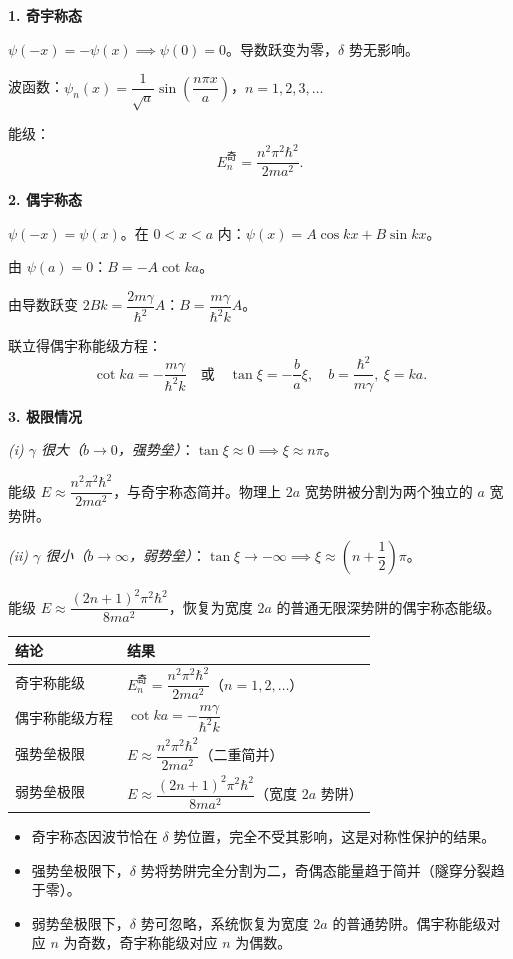 \begin{derivationbox}[标准解题过程]
\textbf{1. 奇宇称态}

$\psi(-x)=-\psi(x)\implies\psi(0)=0$。导数跃变为零，$\delta$ 势无影响。

波函数：$\psi_n(x)=\dfrac{1}{\sqrt{a}}\sin\left(\dfrac{n\pi x}{a}\right)$，$n=1,2,3,\ldots$

能级：
\begin{equation}
\boxed{E_n^{\text{奇}}=\frac{n^2\pi^2\hbar^2}{2ma^2}.}
\end{equation}

\textbf{2. 偶宇称态}

$\psi(-x)=\psi(x)$。在 $0<x<a$ 内：$\psi(x)=A\cos kx+B\sin kx$。

由 $\psi(a)=0$：$B=-A\cot ka$。

由导数跃变 $2Bk=\dfrac{2m\gamma}{\hbar^2}A$：$B=\dfrac{m\gamma}{\hbar^2k}A$。

联立得偶宇称能级方程：
\begin{equation}
\boxed{\cot ka=-\frac{m\gamma}{\hbar^2k}\quad\text{或}\quad\tan\xi=-\frac{b}{a}\xi,\quad b=\frac{\hbar^2}{m\gamma},\ \xi=ka.}
\end{equation}

\textbf{3. 极限情况}

\textit{(i) $\gamma$ 很大（$b\to0$，强势垒）}：$\tan\xi\approx0\implies\xi\approx n\pi$。

能级 $E\approx\dfrac{n^2\pi^2\hbar^2}{2ma^2}$，与奇宇称态简并。物理上 $2a$ 宽势阱被分割为两个独立的 $a$ 宽势阱。

\textit{(ii) $\gamma$ 很小（$b\to\infty$，弱势垒）}：$\tan\xi\to-\infty\implies\xi\approx\left(n+\dfrac{1}{2}\right)\pi$。

能级 $E\approx\dfrac{(2n+1)^2\pi^2\hbar^2}{8ma^2}$，恢复为宽度 $2a$ 的普通无限深势阱的偶宇称态能级。
\end{derivationbox}

\begin{formulabox}[答案汇总]
\begin{center}
\begin{tabular}{ll}
\toprule
\textbf{结论} & \textbf{结果} \\
\midrule
奇宇称能级 & $E_n^{\text{奇}}=\dfrac{n^2\pi^2\hbar^2}{2ma^2}$（$n=1,2,\ldots$） \\
偶宇称能级方程 & $\cot ka=-\dfrac{m\gamma}{\hbar^2k}$ \\
强势垒极限 & $E\approx\dfrac{n^2\pi^2\hbar^2}{2ma^2}$（二重简并） \\
弱势垒极限 & $E\approx\dfrac{(2n+1)^2\pi^2\hbar^2}{8ma^2}$（宽度 $2a$ 势阱） \\
\bottomrule
\end{tabular}
\end{center}
\end{formulabox}

\begin{insightbox}[物理图像]
\begin{itemize}
    \item 奇宇称态因波节恰在 $\delta$ 势位置，完全不受其影响，这是对称性保护的结果。
    \item 强势垒极限下，$\delta$ 势将势阱完全分割为二，奇偶态能量趋于简并（隧穿分裂趋于零）。
    \item 弱势垒极限下，$\delta$ 势可忽略，系统恢复为宽度 $2a$ 的普通势阱。偶宇称能级对应 $n$ 为奇数，奇宇称能级对应 $n$ 为偶数。
\end{itemize}
\end{insightbox}
